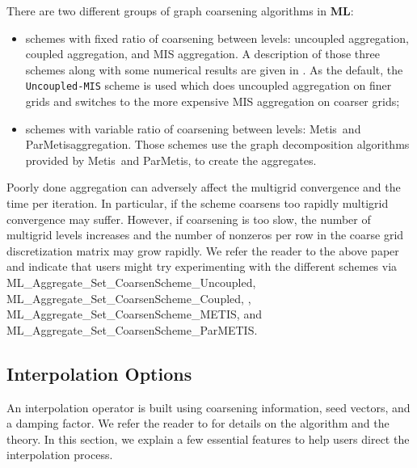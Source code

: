 \documentclass{article}[11pt]
\newcommand{\ML}     {{\bf ML}}
\newcommand{\metis}  {{\sc Metis}}
\newcommand{\parmetis}  {{\sc ParMetis}}
\begin{document}
There are two different groups of graph coarsening algorithms in \ML:
\begin{itemize}
\item schemes with fixed ratio of coarsening between levels: uncoupled
  aggregation, coupled aggregation, and MIS aggregation.  A description
  of those three schemes along with some numerical results are given in
  \cite{supercomputing}. As the default, the {\tt Uncoupled-MIS} scheme is used which
  does uncoupled aggregation on finer grids and switches to the more
  expensive MIS aggregation on coarser grids;
\item schemes with variable ratio of coarsening between levels:
  \metis~and \parmetis aggregation. Those schemes use the graph
  decomposition algorithms provided by \metis~and \parmetis, to create
  the aggregates.
\end{itemize}
Poorly done aggregation can adversely affect the multigrid convergence
and the time per iteration. In particular, if the scheme coarsens too
rapidly multigrid convergence may suffer. However, if coarsening is too
slow, the number of multigrid levels increases and the number of
nonzeros per row in the coarse grid discretization matrix may grow
rapidly. We refer the reader to the above paper and indicate that users
might try experimenting with the different schemes via {\sf
  ML\_Aggregate\_Set\_CoarsenScheme\_Uncoupled}, {\sf
  ML\_Aggregate\_Set\_CoarsenScheme\_Coupled}, , {\sf
  ML\_Aggregate\_Set\_CoarsenScheme\_METIS}, and \\ {\sf
  ML\_Aggregate\_Set\_CoarsenScheme\_ParMETIS}.


\subsection{Interpolation Options}
An interpolation operator is built using coarsening information,
seed vectors, and a damping factor. We refer the 
reader to \cite{vanek4} for details on the algorithm and the theory. 
In this section, we explain a few essential features to
help users direct the interpolation process. 
\end{document}
